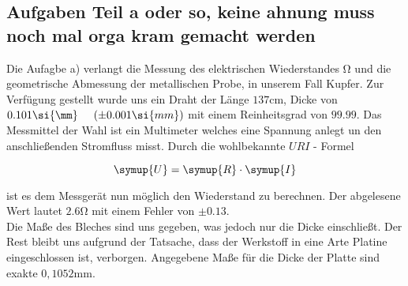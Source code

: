 \subsection{Aufgaben Teil a oder so, keine ahnung muss noch mal orga kram gemacht werden}
\label{sec:aufgabe_a}
Die Aufagbe a) verlangt die Messung des elektrischen Wiederstandes $\si{\ohm}$ und die geometrische Abmessung der metallischen Probe, in unserem Fall Kupfer.
Zur Verfügung gestellt wurde uns ein Draht der Länge $137\si{\cm}$, Dicke von $0.101 \si{\mm} \hspace{0.5cm} (\pm 0.001 \si{mm})$ mit einem Reinheitsgrad von $99.99$. 
Das Messmittel der Wahl ist ein Multimeter welches eine Spannung anlegt un den anschließenden Stromfluss misst.
Durch die wohlbekannte  $URI$ - Formel 

\begin{equation}
   \symup{U} = \symup{R} \cdot \symup{I}
\end{equation}

ist es dem  Messgerät nun möglich den Wiederstand zu berechnen.
Der abgelesene Wert lautet $2.6\si{\ohm}$ mit einem Fehler von $\pm 0.13$. \\ 

Die Maße des Bleches sind uns gegeben, was jedoch nur die Dicke einschließt. %
Der Rest bleibt uns aufgrund der Tatsache, dass der Werkstoff in eine Arte Platine eingeschlossen ist, verborgen.
Angegebene Maße für die Dicke der Platte sind exakte $0,1052\si{\mm}$.
